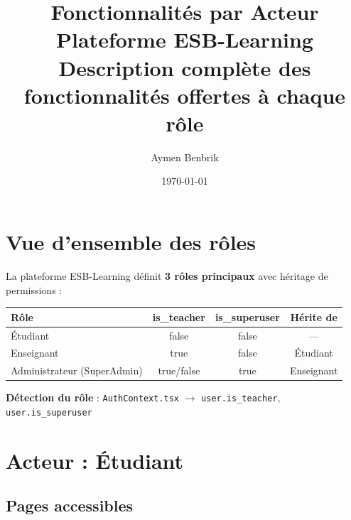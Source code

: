 \documentclass[12pt,a4paper]{article}
\title{\textbf{Fonctionnalités par Acteur}\\[0.5em]
\large Plateforme ESB-Learning\\[0.3em]
\normalsize Description complète des fonctionnalités offertes à chaque rôle}
\author{Aymen Benbrik}
\date{\today}
\begin{document}
\maketitle
\tableofcontents
\newpage

\section{Vue d'ensemble des rôles}

La plateforme ESB-Learning définit \textbf{3 rôles principaux} avec héritage de permissions :

\begin{center}
\begin{tabular}{@{}lccc@{}}
\toprule
\textbf{Rôle} & \textbf{is\_teacher} & \textbf{is\_superuser} & \textbf{Hérite de} \\
\midrule
Étudiant & false & false & --- \\
Enseignant & true & false & Étudiant \\
Administrateur (SuperAdmin) & true/false & true & Enseignant \\
\bottomrule
\end{tabular}
\end{center}

\textbf{Détection du rôle} : \texttt{AuthContext.tsx} $\rightarrow$ \texttt{user.is\_teacher}, \texttt{user.is\_superuser}

\section{Acteur : Étudiant}

\subsection{Pages accessibles}
\end{document}
